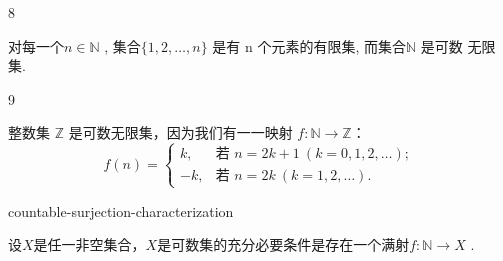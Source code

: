 \begin{sourceexample}{8}

对每一个\(n \in \mathbb{N}\) , 集合\(\{1, 2, \dots, n\}\) 是有 n 个元素的有限集, 而集合\(\mathbb{N}\) 是可数 无限集.

\end{sourceexample}

\begin{sourceexample}{9}

整数集 \(\mathbb{Z}\) 是可数无限集，因为我们有一一映射 \(f: \mathbb{N} \to \mathbb{Z}\)：
\[
f(n) =
\begin{cases}
	k,   & \text{若 } n = 2k+1 \ (k = 0, 1, 2, \dots); \\
	-k, & \text{若 } n = 2k \ (k = 1, 2, \dots).
\end{cases}
\]
\end{sourceexample}


\begin{mythm}{}{countable-surjection-characterization}

设$X$是任一非空集合，$X$是可数集的充分必要条件是存在一个满射\(f: \mathbb{N} \rightarrow X\) .

\end{mythm}

